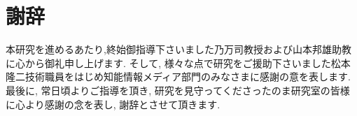 \chapter{謝辞}
本研究を進めるあたり,終始御指導下さいました乃万司教授および山本邦雄助教に心から御礼申し上げます. そして, 様々な点で研究をご援助下さいました松本隆二技術職員をはじめ知能情報メディア部門のみなさまに感謝の意を表します. 最後に, 常日頃よりご指導を頂き, 研究を見守ってくださったのま研究室の皆様に心より感謝の念を表し, 謝辞とさせて頂きます.
